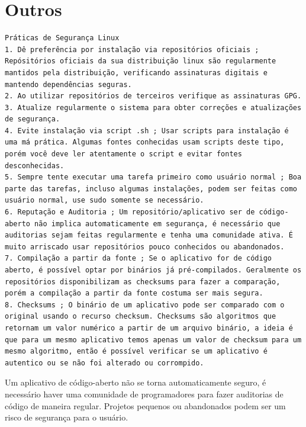 \documentclass[12pt,a4paper]{article}
\begin{document}
\section{Outros}

\begin{lstlisting}
Práticas de Segurança Linux 
1. Dê preferência por instalação via repositórios oficiais ; Repósitórios oficiais da sua distribuição linux são regularmente mantidos pela distribuição, verificando assinaturas digitais e mantendo dependências seguras.
2. Ao utilizar repositórios de terceiros verifique as assinaturas GPG.
3. Atualize regularmente o sistema para obter correções e atualizações de segurança.
4. Evite instalação via script .sh ; Usar scripts para instalação é uma má prática. Algumas fontes conhecidas usam scripts deste tipo, porém você deve ler atentamente o script e evitar fontes desconhecidas. 
5. Sempre tente executar uma tarefa primeiro como usuário normal ; Boa parte das tarefas, incluso algumas instalações, podem ser feitas como usuário normal, use sudo somente se necessário.
6. Reputação e Auditoria ; Um repositório/aplicativo ser de código-aberto não implica automaticamente em segurança, é necessário que auditorias sejam feitas regularmente e tenha uma comunidade ativa. É muito arriscado usar repositórios pouco conhecidos ou abandonados. 
7. Compilação a partir da fonte ; Se o aplicativo for de código aberto, é possível optar por binários já pré-compilados. Geralmente os repositórios disponibilizam as checksums para fazer a comparação, porém a compilação a partir da fonte costuma ser mais segura. 
8. Checksums ; O binário de um aplicativo pode ser comparado com o original usando o recurso checksum. Checksums são algoritmos que retornam um valor numérico a partir de um arquivo binário, a ideia é que para um mesmo aplicativo temos apenas um valor de checksum para um mesmo algoritmo, então é possível verificar se um aplicativo é autentico ou se não foi alterado ou corrompido. 
\end{lstlisting}

\vspace{\baselineskip}

Um aplicativo de código-aberto não se torna automaticamente seguro, é necessário haver uma comunidade de programadores para fazer auditorias de código de maneira regular. Projetos pequenos ou abandonados podem ser um risco de segurança para o usuário. \\
\end{document}
